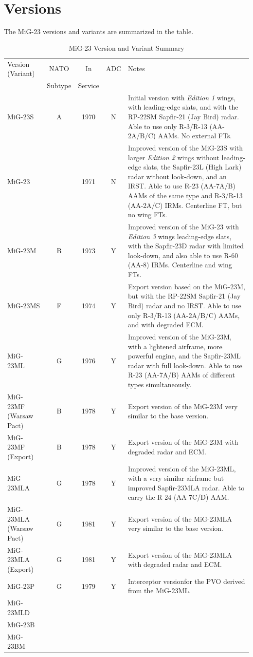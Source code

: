 \section{Versions}

The MiG-23 versions and variants are summarized in the table.

\begin{table}
    \centering
    \caption*{MiG-23 Version and Variant Summary}
    \footnotesize
    \begin{tabularx}{0.9\linewidth}{lcccL}
        \toprule
        Version (Variant)&NATO&In&ADC&Notes\\
        &Subtype&Service\\
        \midrule
        MiG-23S&A&1970&N&Initial version with \emph{Edition 1} wings, with leading-edge slats, and with the RP-22SM Sapfir-21 (Jay Bird) radar. Able to use only R-3/R-13 (AA-2A/B/C) AAMs. No external FTs.\\
        MiG-23&&1971&N&Improved version of the MiG-23S with larger \emph{Edition 2} wings without leading-edge slats, the Sapfir-23L (High Lark) radar without look-down, and an IRST. Able to use R-23 (AA-7A/B) AAMs of the same type and R-3/R-13 (AA-2A/C) IRMs. Centerline FT, but no wing FTs.\\
        MiG-23M&B&1973&Y&Improved version of the MiG-23 with \emph{Edition 3} wings leading-edge slats, with the Sapfir-23D radar with limited look-down, and also able to use R-60 (AA-8) IRMs. Centerline and wing FTs.\\
        MiG-23MS&F&1974&Y&Export version based on the MiG-23M, but with the RP-22SM Sapfir-21 (Jay Bird) radar and no IRST. Able to use only R-3/R-13 (AA-2A/B/C) AAMs, and with degraded ECM.\\
        MiG-23ML&G&1976&Y&Improved version of the MiG-23M, with a lightened airframe, more powerful engine, and the Sapfir-23ML radar with full look-down. Able to use R-23 (AA-7A/B) AAMs of different types simultaneously.\\
        MiG-23MF (Warsaw Pact)&B&1978&Y&Export version of the MiG-23M very similar to the base version.\\
        MiG-23MF (Export)&B&1978&Y&Export version of the MiG-23M with degraded radar and ECM.\\
        MiG-23MLA&G&1978&Y&Improved version of the MiG-23ML, with a very similar airframe but improved Sapfir-23MLA radar. Able to carry the R-24 (AA-7C/D) AAM.\\
        MiG-23MLA (Warsaw Pact)&G&1981&Y&Export version of the MiG-23MLA very similar to the base version.\\
        MiG-23MLA (Export)&G&1981&Y&Export version of the MiG-23MLA with degraded radar and ECM.\\
        MiG-23P&G&1979&Y&Interceptor versionfor the PVO derived from the MiG-23ML.\\
        MiG-23MLD\\
        MiG-23B\\
        MiG-23BM\\
        \bottomrule
    \end{tabularx}
\end{table}

